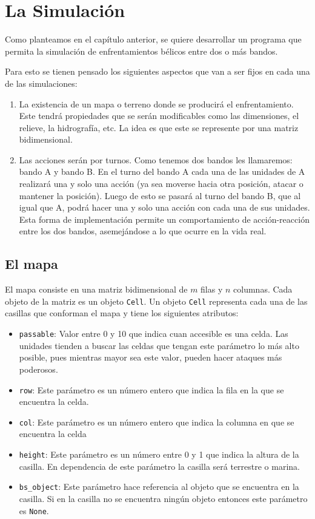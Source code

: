\section{La Simulación}

Como planteamos en el capítulo anterior, se quiere desarrollar un programa que permita la simulación de enfrentamientos bélicos entre dos o más bandos.

Para esto se tienen pensado los siguientes aspectos que van a ser fijos en cada una de las simulaciones:

\begin{enumerate}
	\item La existencia de un mapa o terreno donde se producirá el enfrentamiento. Este tendrá propiedades que se serán modificables como las dimensiones, el relieve, la hidrografía, etc. La idea es que este se represente por una matriz bidimensional.
	
	\item Las acciones serán por turnos. Como tenemos dos bandos les llamaremos: bando A y bando B. En el turno del bando A cada una de las unidades de A realizará una y solo una acción (ya sea moverse hacia otra posición, atacar o mantener la posición). Luego de esto se pasará al turno del bando B, que al igual que A, podrá hacer una y solo una acción con cada una de sus unidades. Esta forma de implementación permite un comportamiento de acción-reacción entre los dos bandos, asemejándose a lo que ocurre en la vida real.
	
\end{enumerate}

\subsection{El mapa}

El mapa consiste en una matriz bidimensional de $m$ filas y $n$ columnas. Cada objeto de la matriz es un objeto \verb|Cell|. Un objeto \verb|Cell| representa cada una de las casillas que conforman el mapa y tiene los siguientes atributos:

\begin{itemize}
	\item \verb|passable|: Valor entre 0 y 10 que indica cuan accesible es una celda. Las unidades tienden a buscar las celdas que tengan este parámetro lo más alto posible, pues mientras mayor sea este valor, pueden hacer ataques más poderosos.
	\item \verb|row|: Este parámetro es un número entero que indica la fila en la que se encuentra la celda.
	\item \verb|col|: Este parámetro es un número entero que indica la columna en que se encuentra la celda
	\item \verb|height|: Este parámetro es un número entre 0 y 1 que indica la altura de la casilla. En dependencia de este parámetro la casilla será terrestre o marina.
	\item \verb|bs_object|: Este parámetro hace referencia al objeto que se encuentra en la casilla. Si en la casilla no se encuentra ningún objeto entonces este parámetro es \verb|None|.
\end{itemize}

